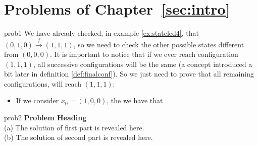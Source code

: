 %


\section*{Problems of Chapter~\ref{sec:intro}}

\begin{sol}{prob1}
We have already checked, in example \ref{ex:stateled4}, that
$(0,1,0) \overset{f}{\rightarrow} (1,1,1)$, so we need to check the other possible
states different from $(0,0,0)$. It is important to notice that if we ever reach configuration
$(1,1,1)$, all successive configurations will be the same (a concept introduced a bit later 
in definition \ref{def:finalconf}). So we just need to prove that all remaining configurations,
will reach $(1,1,1)$:
\begin{itemize}
\item If we consider $x_0 = (1,0,0)$, the we have that 
\end{itemize}
\end{sol}


\begin{sol}{prob2}
\textbf{Problem Heading}\\
(a) The solution of first part is revealed here.\\
(b) The solution of second part is revealed here.
\end{sol}
